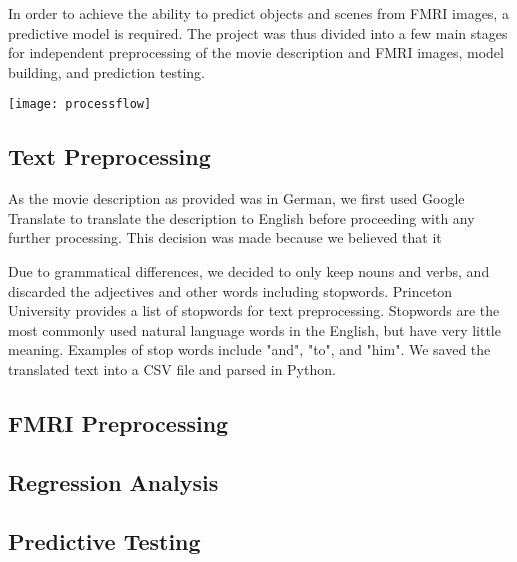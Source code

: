

\par In order to achieve the ability to predict objects and scenes 
from FMRI images, a predictive model is required. The project was thus 
divided into a few main stages for independent preprocessing of the 
movie description and FMRI images, model building, and prediction
testing.

\centerline{\texttt{[image: processflow]}}

\subsection{Text Preprocessing}
\par As the movie description as provided was in German, we first used Google
Translate to translate the description to English before proceeding with 
any further processing. This decision was made because we believed that 
it

Due to grammatical differences, we decided to
 only keep nouns and verbs, and discarded the adjectives and other words including
 stopwords. Princeton University provides a list of stopwords for text preprocessing.
 Stopwords are the most commonly used natural language words in the English, but have 
 very little meaning. Examples of stop words include "and", "to", and "him". We saved 
 the translated text into a CSV file and parsed in Python. 

\subsection{FMRI Preprocessing}

\subsection{Regression Analysis}

\subsection{Predictive Testing}

